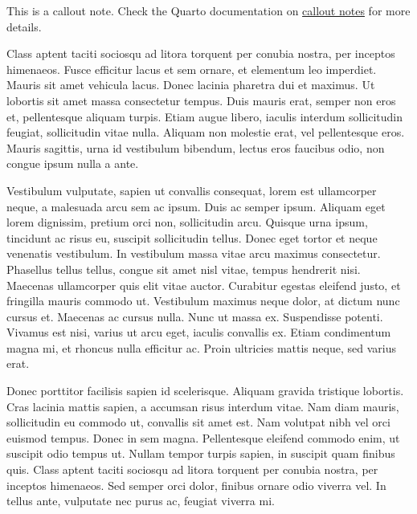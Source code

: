 \documentclass[
  12pt,
  a4paperpaper,
  a4paper]{scrreprt}
\begin{document}
\begin{tcolorbox}[enhanced jigsaw, rightrule=.15mm, opacityback=0, bottomtitle=1mm, left=2mm, breakable, colbacktitle=quarto-callout-note-color!10!white, leftrule=.75mm, coltitle=black, title=\textcolor{quarto-callout-note-color}{\faInfo}\hspace{0.5em}{Hinweis}, bottomrule=.15mm, colback=white, toptitle=1mm, toprule=.15mm, colframe=quarto-callout-note-color-frame, titlerule=0mm, arc=.35mm, opacitybacktitle=0.6]

This is a callout note. Check the Quarto documentation on
\href{https://quarto.org/docs/authoring/callouts.html}{callout notes}
for more details.

\end{tcolorbox}

Class aptent taciti sociosqu ad litora torquent per conubia nostra, per
inceptos himenaeos. Fusce efficitur lacus et sem ornare, et elementum
leo imperdiet. Mauris sit amet vehicula lacus. Donec lacinia pharetra
dui et maximus. Ut lobortis sit amet massa consectetur tempus. Duis
mauris erat, semper non eros et, pellentesque aliquam turpis. Etiam
augue libero, iaculis interdum sollicitudin feugiat, sollicitudin vitae
nulla. Aliquam non molestie erat, vel pellentesque eros. Mauris
sagittis, urna id vestibulum bibendum, lectus eros faucibus odio, non
congue ipsum nulla a ante.

Vestibulum vulputate, sapien ut convallis consequat, lorem est
ullamcorper neque, a malesuada arcu sem ac ipsum. Duis ac semper ipsum.
Aliquam eget lorem dignissim, pretium orci non, sollicitudin arcu.
Quisque urna ipsum, tincidunt ac risus eu, suscipit sollicitudin tellus.
Donec eget tortor et neque venenatis vestibulum. In vestibulum massa
vitae arcu maximus consectetur. Phasellus tellus tellus, congue sit amet
nisl vitae, tempus hendrerit nisi. Maecenas ullamcorper quis elit vitae
auctor. Curabitur egestas eleifend justo, et fringilla mauris commodo
ut. Vestibulum maximus neque dolor, at dictum nunc cursus et. Maecenas
ac cursus nulla. Nunc ut massa ex. Suspendisse potenti. Vivamus est
nisi, varius ut arcu eget, iaculis convallis ex. Etiam condimentum magna
mi, et rhoncus nulla efficitur ac. Proin ultricies mattis neque, sed
varius erat.

Donec porttitor facilisis sapien id scelerisque. Aliquam gravida
tristique lobortis. Cras lacinia mattis sapien, a accumsan risus
interdum vitae. Nam diam mauris, sollicitudin eu commodo ut, convallis
sit amet est. Nam volutpat nibh vel orci euismod tempus. Donec in sem
magna. Pellentesque eleifend commodo enim, ut suscipit odio tempus ut.
Nullam tempor turpis sapien, in suscipit quam finibus quis. Class aptent
taciti sociosqu ad litora torquent per conubia nostra, per inceptos
himenaeos. Sed semper orci dolor, finibus ornare odio viverra vel. In
tellus ante, vulputate nec purus ac, feugiat viverra mi.
\end{document}

